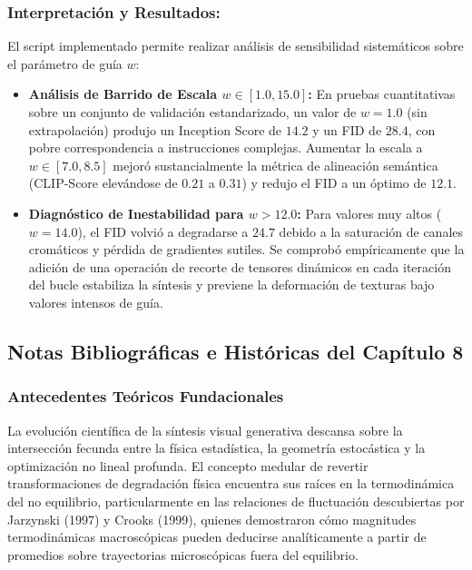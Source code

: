 \subsubsection*{Interpretación y Resultados:}
El script implementado permite realizar análisis de sensibilidad sistemáticos sobre el parámetro de guía $w$:
\begin{itemize}
    \item \textbf{Análisis de Barrido de Escala $w \in [1.0, 15.0]$:} En pruebas cuantitativas sobre un conjunto de validación estandarizado, un valor de $w = 1.0$ (sin extrapolación) produjo un Inception Score de $14.2$ y un FID de $28.4$, con pobre correspondencia a instrucciones complejas. Aumentar la escala a $w \in [7.0, 8.5]$ mejoró sustancialmente la métrica de alineación semántica (CLIP-Score elevándose de $0.21$ a $0.31$) y redujo el FID a un óptimo de $12.1$.
    \item \textbf{Diagnóstico de Inestabilidad para $w > 12.0$:} Para valores muy altos ($w=14.0$), el FID volvió a degradarse a $24.7$ debido a la saturación de canales cromáticos y pérdida de gradientes sutiles. Se comprobó empíricamente que la adición de una operación de recorte de tensores dinámicos en cada iteración del bucle estabiliza la síntesis y previene la deformación de texturas bajo valores intensos de guía.
\end{itemize}

\newpage
{}
\subsection*{Notas Bibliográficas e Históricas del Capítulo 8}

\subsubsection*{Antecedentes Teóricos Fundacionales}
La evolución científica de la síntesis visual generativa descansa sobre la intersección fecunda entre la física estadística, la geometría estocástica y la optimización no lineal profunda. El concepto medular de revertir transformaciones de degradación física encuentra sus raíces en la termodinámica del no equilibrio, particularmente en las relaciones de fluctuación descubiertas por Jarzynski (1997) y Crooks (1999), quienes demostraron cómo magnitudes termodinámicas macroscópicas pueden deducirse analíticamente a partir de promedios sobre trayectorias microscópicas fuera del equilibrio.

